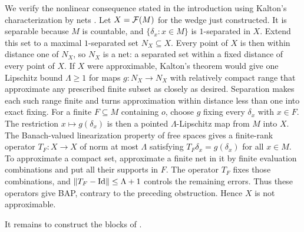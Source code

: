 We verify the nonlinear consequence stated in the introduction using
Kalton's characterization by nets \cite[Theorem~4.4 and p.~1260]{Kalton12}.
Let $X=\mathcal F(M)$ for the
wedge just constructed. It is separable because $M$ is countable, and
$\{\delta_x:x\in M\}$ is $1$-separated in $X$. Extend this set to a maximal
$1$-separated set $N_X\subseteq X$. Every point of $X$ is then within
distance one of $N_X$, so $N_X$ is a net: a separated set within a fixed
distance of every point of $X$. If $X$ were approximable, Kalton's theorem
would give one Lipschitz bound $\Lambda\ge1$ for maps $g:N_X\to N_X$
with relatively compact range that approximate any prescribed finite subset
as closely as desired. Separation makes each such range finite and turns
approximation within distance less than one into exact fixing. For a finite
$F\subseteq M$ containing $o$, choose $g$ fixing every $\delta_x$ with
$x\in F$. The restriction $x\mapsto g(\delta_x)$ is then a pointed
$\Lambda$-Lipschitz map from $M$ into $X$. The Banach-valued linearization
property of free spaces \cite[Lemma~3.2]{Kalton04} gives a finite-rank
operator $T_F:X\to X$ of norm at most $\Lambda$ satisfying
$T_F\delta_x=g(\delta_x)$ for all $x\in M$. To approximate a compact set,
approximate a finite net in it by finite evaluation combinations and put
all their supports in $F$. The operator $T_F$ fixes those combinations,
and $\left\|T_F-\operatorname{Id}\right\|\le\Lambda+1$ controls the remaining errors. Thus these
operators give BAP, contrary to the preceding obstruction. Hence $X$ is not
approximable.

It remains to construct the blocks of .
